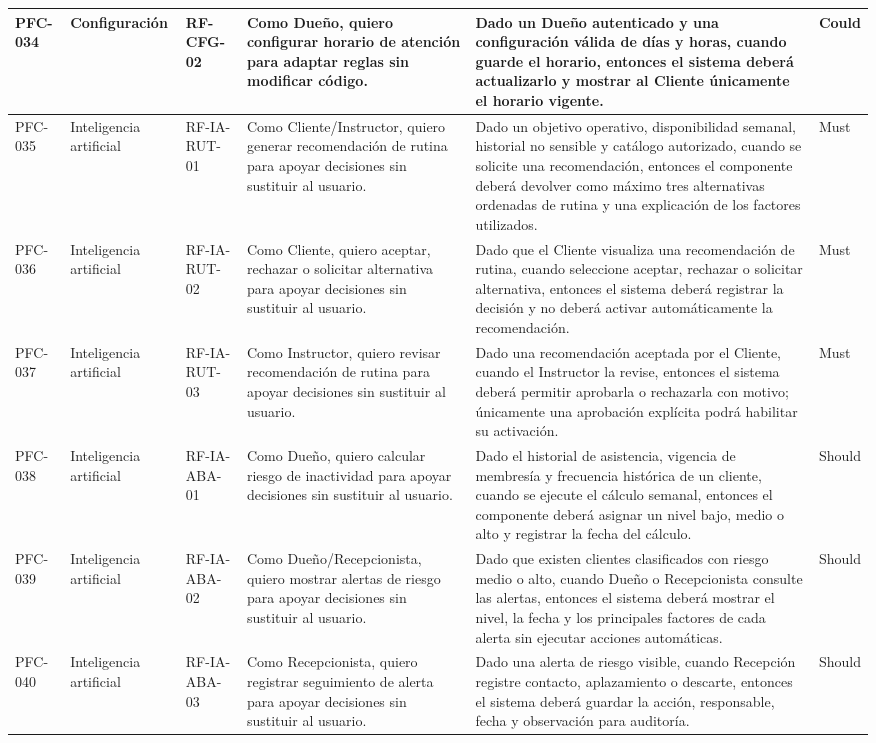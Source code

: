 \begin{landscape}
\begin{longtable}{|p{1.6cm}|p{2cm}|p{2.2cm}|p{7.2cm}|p{5.5cm}|p{1.8cm}|}
PFC-034 & Configuración & RF-CFG-02 & Como Dueño, quiero configurar horario de atención para adaptar reglas sin modificar código. & Dado un Dueño autenticado y una configuración válida de días y horas, cuando guarde el horario, entonces el sistema deberá actualizarlo y mostrar al Cliente únicamente el horario vigente. & Could \\ \hline
PFC-035 & Inteligencia artificial & RF-IA-RUT-01 & Como Cliente/Instructor, quiero generar recomendación de rutina para apoyar decisiones sin sustituir al usuario. & Dado un objetivo operativo, disponibilidad semanal, historial no sensible y catálogo autorizado, cuando se solicite una recomendación, entonces el componente deberá devolver como máximo tres alternativas ordenadas de rutina y una explicación de los factores utilizados. & Must \\ \hline
PFC-036 & Inteligencia artificial & RF-IA-RUT-02 & Como Cliente, quiero aceptar, rechazar o solicitar alternativa para apoyar decisiones sin sustituir al usuario. & Dado que el Cliente visualiza una recomendación de rutina, cuando seleccione aceptar, rechazar o solicitar alternativa, entonces el sistema deberá registrar la decisión y no deberá activar automáticamente la recomendación. & Must \\ \hline
PFC-037 & Inteligencia artificial & RF-IA-RUT-03 & Como Instructor, quiero revisar recomendación de rutina para apoyar decisiones sin sustituir al usuario. & Dado una recomendación aceptada por el Cliente, cuando el Instructor la revise, entonces el sistema deberá permitir aprobarla o rechazarla con motivo; únicamente una aprobación explícita podrá habilitar su activación. & Must \\ \hline
PFC-038 & Inteligencia artificial & RF-IA-ABA-01 & Como Dueño, quiero calcular riesgo de inactividad para apoyar decisiones sin sustituir al usuario. & Dado el historial de asistencia, vigencia de membresía y frecuencia histórica de un cliente, cuando se ejecute el cálculo semanal, entonces el componente deberá asignar un nivel bajo, medio o alto y registrar la fecha del cálculo. & Should \\ \hline
PFC-039 & Inteligencia artificial & RF-IA-ABA-02 & Como Dueño/Recepcionista, quiero mostrar alertas de riesgo para apoyar decisiones sin sustituir al usuario. & Dado que existen clientes clasificados con riesgo medio o alto, cuando Dueño o Recepcionista consulte las alertas, entonces el sistema deberá mostrar el nivel, la fecha y los principales factores de cada alerta sin ejecutar acciones automáticas. & Should \\ \hline
PFC-040 & Inteligencia artificial & RF-IA-ABA-03 & Como Recepcionista, quiero registrar seguimiento de alerta para apoyar decisiones sin sustituir al usuario. & Dado una alerta de riesgo visible, cuando Recepción registre contacto, aplazamiento o descarte, entonces el sistema deberá guardar la acción, responsable, fecha y observación para auditoría. & Should \\ \hline
\end{longtable}\end{landscape}

